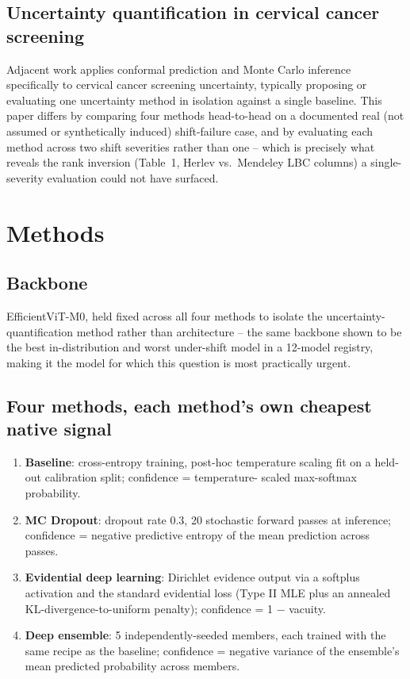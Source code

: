 \documentclass[runningheads]{llncs}
\begin{document}
\subsection{Uncertainty quantification in cervical cancer screening}

Adjacent work applies conformal prediction and Monte Carlo inference
specifically to cervical cancer screening uncertainty, typically
proposing or evaluating one uncertainty method in isolation against a
single baseline. This paper differs by comparing four methods head-to-head
on a documented real (not assumed or synthetically induced) shift-failure
case, and by evaluating each method across two shift severities rather
than one -- which is precisely what reveals the rank inversion (Table~1,
Herlev vs.\ Mendeley LBC columns) a single-severity evaluation could not
have surfaced.

\section{Methods}

\subsection{Backbone}

EfficientViT-M0, held fixed across all four methods to isolate the
uncertainty-quantification method rather than architecture -- the same
backbone shown to be the best in-distribution and worst under-shift model
in a 12-model registry, making it the model for which this question is
most practically urgent.

\subsection{Four methods, each method's own cheapest native signal}

\begin{enumerate}
\item \textbf{Baseline}: cross-entropy training, post-hoc temperature
scaling fit on a held-out calibration split; confidence = temperature-
scaled max-softmax probability.
\item \textbf{MC Dropout}: dropout rate 0.3, 20 stochastic forward passes
at inference; confidence = negative predictive entropy of the mean
prediction across passes.
\item \textbf{Evidential deep learning}: Dirichlet evidence output via a
softplus activation and the standard evidential loss (Type II MLE plus an
annealed KL-divergence-to-uniform penalty); confidence = 1 $-$ vacuity.
\item \textbf{Deep ensemble}: 5 independently-seeded members, each trained
with the same recipe as the baseline; confidence = negative variance of
the ensemble's mean predicted probability across members.
\end{enumerate}
\end{document}
